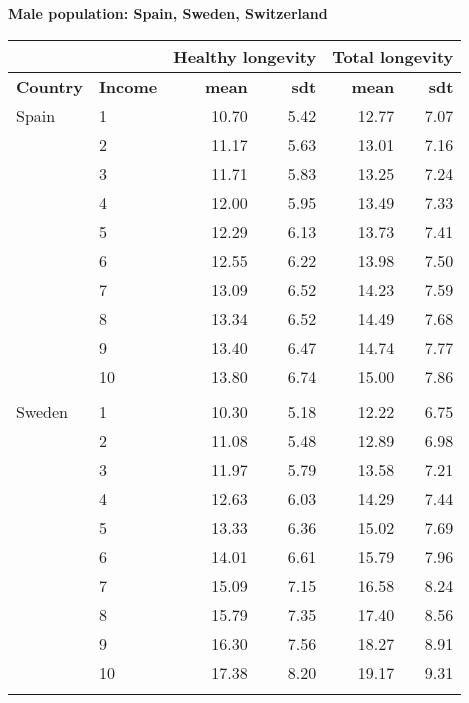 \begin{table}
\centering \textbf{Male population: Spain, Sweden, Switzerland}\par\medskip\medskip
\begin{tabular}{llrrrr}
\toprule
& & \multicolumn{2}{l}{Healthy longevity} & \multicolumn{2}{l}{Total longevity} \\
\midrule
\textbf{Country }& \textbf{Income} &  \textbf{mean}       &  \textbf{sdt}     &     \textbf{mean}         & \textbf{sdt}    \\
\midrule
Spain & 1  &   10.70 &   5.42 &  12.77 &   7.07 \\
            & 2  &   11.17 &   5.63 &  13.01 &   7.16 \\
            & 3  &   11.71 &   5.83 &  13.25 &   7.24 \\
            & 4  &   12.00 &   5.95 &  13.49 &   7.33 \\
            & 5  &   12.29 &   6.13 &  13.73 &   7.41 \\
            & 6  &   12.55 &   6.22 &  13.98 &   7.50 \\
            & 7  &   13.09 &   6.52 &  14.23 &   7.59 \\
            & 8  &   13.34 &   6.52 &  14.49 &   7.68 \\
            & 9  &   13.40 &   6.47 &  14.74 &   7.77 \\
            & 10 &   13.80 &   6.74 &  15.00 &   7.86 \\
              & &    &   &   &  \\
Sweden & 1  &   10.30 &   5.18 &  12.22 &   6.75 \\
            & 2  &   11.08 &   5.48 &  12.89 &   6.98 \\
            & 3  &   11.97 &   5.79 &  13.58 &   7.21 \\
            & 4  &   12.63 &   6.03 &  14.29 &   7.44 \\
            & 5  &   13.33 &   6.36 &  15.02 &   7.69 \\
            & 6  &   14.01 &   6.61 &  15.79 &   7.96 \\
            & 7  &   15.09 &   7.15 &  16.58 &   8.24 \\
            & 8  &   15.79 &   7.35 &  17.40 &   8.56 \\
            & 9  &   16.30 &   7.56 &  18.27 &   8.91 \\
            & 10 &   17.38 &   8.20 &  19.17 &   9.31 \\
              & &    &   &   &  \\

\end{tabular}
\end{table}
